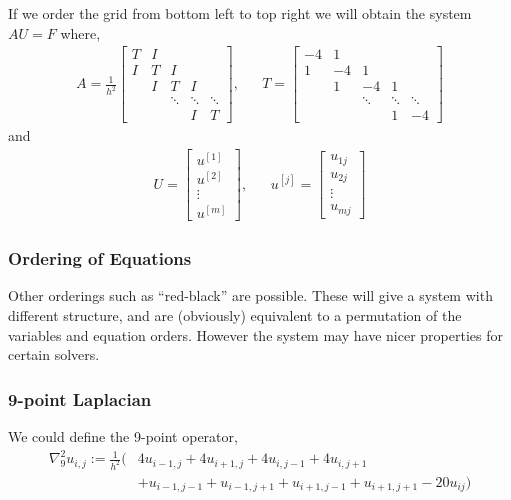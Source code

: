 \documentclass[12pt]{article}
\begin{document}
If we order the grid from bottom left to top right we will obtain the system \( AU=F \) where,
\begin{align*}
    A = \frac{1}{h^2} \left[\begin{array}{ccccc}
    T & I \\
    I & T & I \\
    & I & T & I \\
    & & \ddots &\ddots & \ddots \\
    & & & I & T
    \end{array}\right], &&
    T=
    \left[\begin{array}{ccccc}
    -4 & 1 \\
    1 & -4 & 1 \\
    & 1 & -4 & 1 \\
    & & \ddots &\ddots & \ddots \\
    & & & 1 & -4
    \end{array}\right]
\end{align*}
and
\begin{align*}
    U =
    \left[\begin{array}{c}
    u^{[1]} \\ u^{[2]} \\ \vdots \\ u^{[m]}
    \end{array}\right]
    , &&
    u^{[j]}=
    \left[\begin{array}{c}
    u_{1j} \\ u_{2j} \\ \vdots \\ u_{mj}
    \end{array}\right]
\end{align*}

\subsubsection{Ordering of Equations}
Other orderings such as ``red-black'' are possible. These will give a system with different structure, and are (obviously) equivalent to a permutation of the variables and equation orders. However the system may have nicer properties for certain solvers.



\subsubsection{9-point Laplacian}
We could define the 9-point operator,
\begin{align*}
    \nabla_9^2 u_{i,j} := \frac{1}{h^2} (&4u_{i-1,j}+4u_{i+1,j}+4u_{i,j-1}+4u_{i,j+1}\\
    &+ u_{i-1,j-1} + u_{i-1,j+1} + u_{i+1,j-1} + u_{i+1,j+1} -20u_{ij})
\end{align*}
\end{document}
